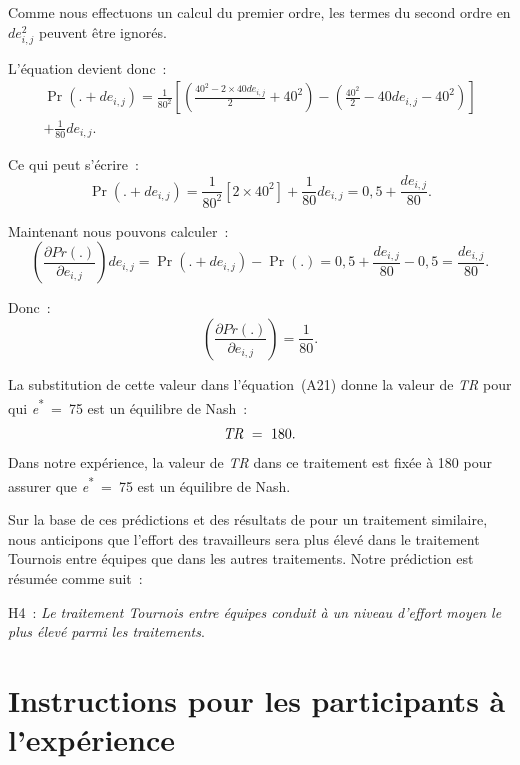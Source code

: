 \begin{Article}
\begin{refsection}[Lebourges]
\begin{appendices}
Comme nous effectuons un calcul du premier ordre, les termes du second
ordre en \(de_{i,j}^{2}\) peuvent être ignorés.

L'équation devient donc~:
\begin{multline}
\Pr\left( . + de_{i,j} \right) = \frac{1}{80^{2}}\left\lbrack \left( \frac{40^{2} - 2\times40de_{i,j}}{2} + 40^{2} \right) - \left( \frac{40^{2}}{2} - 40de_{i,j} - 40^{2} \right) \right\rbrack \\
+ \frac{1}{80}de_{i,j}.
\end{multline}

Ce qui peut s'écrire~:
\begin{equation}
    \Pr\left( . + de_{i,j} \right) = \frac{1}{80^{2}}\left\lbrack 2\times40^{2} \right\rbrack + \frac{1}{80}de_{i,j} = 0,5 + \frac{de_{i,j}}{80}.
\end{equation}

Maintenant nous pouvons calculer~:
\begin{equation}
    \left( \frac{\partial Pr(.)}{\partial e_{i,j}} \right)de_{i,j} = \Pr\left( . + de_{i,j} \right) - \Pr(.) = 0,5 + \frac{de_{i,j}}{80} - 0,5 = \frac{de_{i,j}}{80}.
\end{equation}

Donc~:
\begin{equation}
    \left( \frac{\partial Pr(.)}{\partial e_{i,j}} \right) = \frac{1}{80}.
\end{equation}

La substitution de cette valeur dans l'équation~(A21) donne la valeur de
\emph{TR} pour qui \emph{e}\textsuperscript{*}~=~75 est un équilibre de
Nash~:
\[
\emph{TR}~=~180.
\]
Dans notre expérience, la valeur de \emph{TR} dans ce traitement est
fixée à 180 pour assurer que \emph{e}\textsuperscript{*}~=~75 est un
équilibre de Nash.

Sur la base de ces prédictions et des résultats de \textcite{NalbantianSchotter1997} pour un traitement similaire, nous anticipons que l'effort des travailleurs sera plus élevé dans le traitement Tournois entre équipes que dans les autres traitements. Notre prédiction est résumée comme suit~:

\vspace{0.2cm}
H4~: \emph{Le traitement Tournois entre équipes conduit à un niveau
d'effort moyen le plus élevé parmi les traitements}.

\section{Instructions pour les participants à l'expérience}
\label{Annexe:Instructions}


\end{appendices}
\end{refsection}
\end{Article}
